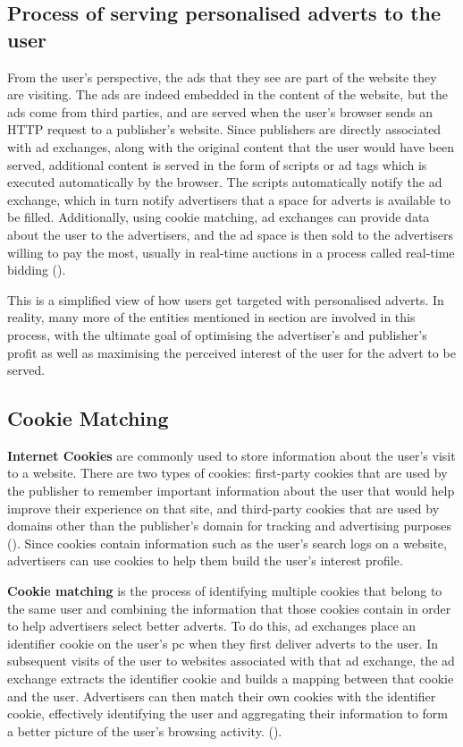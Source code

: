 \documentclass{l4proj}
\begin{document}
\subsection{Process of serving personalised adverts to the user}
From the user's perspective, the ads that they see are part of the website they are visiting. The ads are indeed embedded in the content of the website, but the ads come from third parties, and are served when the user's browser sends an HTTP request to a publisher's website. Since publishers are directly associated with ad exchanges, along with the original content that the user would have been served, additional content is served in the form of scripts or ad tags which is executed automatically by the browser. The scripts automatically notify the ad exchange, which in turn notify advertisers that a space for adverts is available to be filled. Additionally, using cookie matching, ad exchanges can provide data about the user to the advertisers, and the ad space is then sold to the advertisers willing to pay the most, usually in real-time auctions in a process called real-time bidding (\cite{Estrada-Jimenez2017}).

This is a simplified view of how users get targeted with personalised adverts. In reality, many more of the entities mentioned in section  are involved in this process, with the ultimate goal of optimising the advertiser's and publisher's profit as well as maximising the perceived interest of the user for the advert to be served.

\subsection{Cookie Matching}
\textbf{Internet Cookies} are commonly used to store information about the user's visit to a website. There are two types of cookies: first-party cookies that are used by the publisher to remember important information about the user that would help improve their experience on that site, and third-party cookies that are used by domains other than the publisher's domain for tracking and advertising purposes (\cite{Estrada-Jimenez2017}). Since cookies contain information such as the user's search logs on a website, advertisers can use cookies to help them build the user's interest profile. 

\textbf{Cookie matching} is the process of identifying multiple cookies that belong to the same user and combining the information that those cookies contain in order to help advertisers select better adverts. To do this, ad exchanges place an identifier cookie on the user's pc when they first deliver adverts to the user. In subsequent visits of the user to websites associated with that ad exchange, the ad exchange extracts the identifier cookie and builds a mapping between that cookie and the user. Advertisers can then match their own cookies with the identifier cookie, effectively identifying the user and aggregating their information to form a better picture of the user's browsing activity. (\cite{Grandmont1985}).
\end{document}
